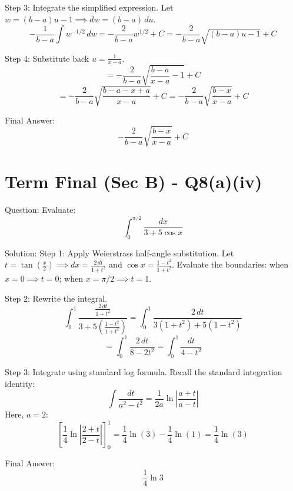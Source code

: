 \documentclass{article}
\begin{document}
Step 3: Integrate the simplified expression.
Let $w = (b-a)u - 1 \implies dw = (b-a) \, du$.
\[
-\frac{1}{b-a} \int w^{-1/2} \, dw = -\frac{2}{b-a} w^{1/2} + C = -\frac{2}{b-a}\sqrt{(b-a)u - 1} + C
\]

Step 4: Substitute back $u = \frac{1}{x-a}$.
\[
= -\frac{2}{b-a}\sqrt{ \frac{b-a}{x-a} - 1 } + C
\]
\[
= -\frac{2}{b-a}\sqrt{ \frac{b-a - x + a}{x-a} } + C = -\frac{2}{b-a}\sqrt{\frac{b-x}{x-a}} + C
\]

Final Answer:
\[
\boxed{-\frac{2}{b-a}\sqrt{\frac{b-x}{x-a}} + C}
\]

\section*{Term Final (Sec B) - Q8(a)(iv)}
Question:
Evaluate:
\[
\int_0^{\pi/2} \frac{dx}{3+5\cos x}
\]

Solution:
Step 1: Apply Weierstrass half-angle substitution.
Let $t = \tan\left(\frac{x}{2}\right) \implies dx = \frac{2\,dt}{1+t^2}$ and $\cos x = \frac{1-t^2}{1+t^2}$.
Evaluate the boundaries: when $x=0 \implies t=0$; when $x=\pi/2 \implies t=1$.

Step 2: Rewrite the integral.
\[
\int_0^1 \frac{\frac{2\,dt}{1+t^2}}{3 + 5\left(\frac{1-t^2}{1+t^2}\right)} = \int_0^1 \frac{2\,dt}{3(1+t^2) + 5(1-t^2)}
\]
\[
= \int_0^1 \frac{2\,dt}{8 - 2t^2} = \int_0^1 \frac{dt}{4 - t^2}
\]

Step 3: Integrate using standard log formula.
Recall the standard integration identity:
\[
\int \frac{dt}{a^2-t^2} = \frac{1}{2a}\ln\left|\frac{a+t}{a-t}\right|
\]
Here, $a = 2$:
\[
\left[ \frac{1}{4}\ln\left|\frac{2+t}{2-t}\right| \right]_0^1 = \frac{1}{4}\ln(3) - \frac{1}{4}\ln(1) = \frac{1}{4}\ln(3)
\]

Final Answer:
\[
\boxed{\frac{1}{4}\ln 3}
\]

\end{document}
